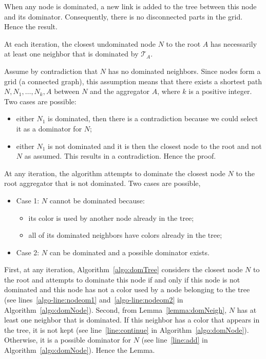 \proof
When any node is dominated, a new link is added to the tree between this node and its dominator. Consequently, there is no disconnected parts in the grid. Hence the result.
\endproof


\begin{lemma}\label{lemma:domNeigh}
At each iteration, the closest undominated node $N$ to the root $A$ has necessarily at least one neighbor that is dominated by $\mathcal{T}_{A}$.
\end{lemma}

\proof
Assume by contradiction that $N$ has no dominated neighbors. Since nodes form a grid (a connected graph), this assumption means that there exists a shortest path $N, N_1, \ldots, N_k, A$ between $N$ and the aggregator $A$, where $k$ is a positive integer. 
Two cases are possible: 
\begin{itemize}
\item either $N_1$ is dominated, then there is a contradiction because we could select it as a dominator for $N$;
\item  either $N_1$ is not dominated and it is then the closest node to the root and not $N$ as assumed. This results in a contradiction. Hence the proof.
\end{itemize}


\endproof

\begin{lemma}\label{lemma:undominated}
At any iteration, the algorithm attempts to dominate the closest node $N$ to the root aggregator that is not dominated. Two cases are possible,
\begin{itemize}
\item Case 1: $N$ cannot be dominated because:
	\begin{itemize}
	\item its color is used by another node already in the tree;
	\item all of its dominated neighbors have colors already in the tree;
	\end{itemize}

\item Case 2: $N$ can be dominated and a possible dominator exists.
\end{itemize}
\end{lemma}

\proof
First, at any iteration, Algorithm~\ref{algo:domTree} considers the closest node $N$ to the root and attempts to dominate this node if and only if this node is not dominated and this node has not a color used by a node belonging to the tree (see lines~\ref{algo-line:nodeom1} and~\ref{algo-line:nodeom2} in Algorithm~\ref{algo:domNode}).
Second, from Lemma~\ref{lemma:domNeigh}, $N$ has at least one neighbor that is dominated. If this neighbor has a color that appears in the tree, it is not kept (see line~\ref{line:continue} in Algorithm~\ref{algo:domNode}). Otherwise, it is a possible dominator for $N$ (see line~\ref{line:add} in Algorithm~\ref{algo:domNode}). Hence the Lemma.\endproof



